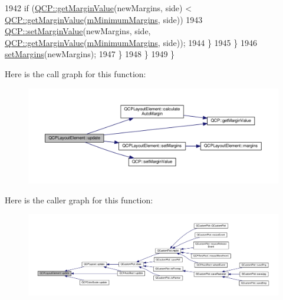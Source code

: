 \begin{DoxyCode}
1942           \textcolor{keywordflow}{if} (\hyperlink{namespace_q_c_p_a23a2679d3495c444acc26acc61e35b5b}{QCP::getMarginValue}(newMargins, side) < 
      \hyperlink{namespace_q_c_p_a23a2679d3495c444acc26acc61e35b5b}{QCP::getMarginValue}(\hyperlink{class_q_c_p_layout_element_a5ba71f25d1af4bb092b28df618538e63}{mMinimumMargins}, side))
1943             \hyperlink{namespace_q_c_p_afbf6e3084c108f2bb4372107945ee82f}{QCP::setMarginValue}(newMargins, side, 
      \hyperlink{namespace_q_c_p_a23a2679d3495c444acc26acc61e35b5b}{QCP::getMarginValue}(\hyperlink{class_q_c_p_layout_element_a5ba71f25d1af4bb092b28df618538e63}{mMinimumMargins}, side));
1944         \}
1945       \}
1946       \hyperlink{class_q_c_p_layout_element_a8f450b1f3f992ad576fce2c63d8b79cf}{setMargins}(newMargins);
1947     \}
1948   \}
1949 \}
\end{DoxyCode}


Here is the call graph for this function\+:\nopagebreak
\begin{figure}[H]
\begin{center}
\leavevmode
\includegraphics[width=350pt]{class_q_c_p_layout_element_a929c2ec62e0e0e1d8418eaa802e2af9b_cgraph}
\end{center}
\end{figure}




Here is the caller graph for this function\+:\nopagebreak
\begin{figure}[H]
\begin{center}
\leavevmode
\includegraphics[width=350pt]{class_q_c_p_layout_element_a929c2ec62e0e0e1d8418eaa802e2af9b_icgraph}
\end{center}
\end{figure}


